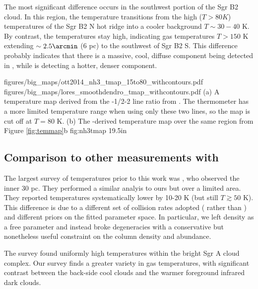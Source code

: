 The most significant difference occurs in the southwest portion of the Sgr B2
cloud.  In this region, the \ammonia temperature transitions from the high
($T>80K$) temperatures of the Sgr B2 N hot ridge into a cooler background
$T\sim30-40$ K.  By contrast, the \formaldehyde temperatures stay high,
indicating gas temperatures $T>150$ K extending $\sim2.5\arcmin$ (6 pc) to the
southwest of Sgr B2 S.  This difference probably indicates that there is a
massive, cool, diffuse component being detected in \ammonia, while
\formaldehyde is detecting a hotter, denser component.

\RotFigureTwoAA
{figures/big_maps/ott2014_nh3_tmap_15to80_withcontours.pdf}
{figures/big_maps/lores_smoothdendro_tmap_withcontours.pdf}
{(a) A temperature map derived from the -1/2-2 line ratio from
\citet{Ott2014a}.  The \ammonia thermometer has a more limited temperature
range when using only these two lines, so the map is cut off at $T=80$ K.
(b) The \para-derived temperature map over the same region from Figure
\ref{fig:temmap}b
}
{fig:nh3tmap}
{1}{9.5in}

\subsection{Comparison to other measurements with \para}
\label{sec:h2cocompare}
The largest survey of \para temperatures prior to this work was
\citet{Ao2013a}, who observed the inner 30 pc.  They performed a similar
analyis to ours but over a limited area.  They reported temperatures
systematically lower by 10-20 K (but still $T\gtrsim50$ K).  This difference is
due to a different set of collision rates adopted (\citet{Wiesenfeld2013a}
rather than \citet{Green1991a}) and different priors on the fitted parameter
space.  In particular, we left density as a free parameter and instead broke
degeneracies with a conservative but nonetheless useful constraint on the
column density and abundance.

The \citet{Ao2013a} survey found uniformly high temperatures within the bright
Sgr A cloud complex.  Our survey finds a greater variety in gas temperatures,
with significant contrast between the back-side cool clouds and the warmer
foreground infrared dark clouds.

